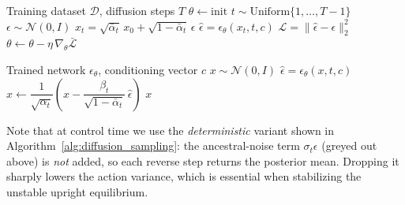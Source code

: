 \documentclass[11pt,a4paper]{article}
\begin{document}
\begin{algorithm}[H]
\caption{Diffusion Model Training}
\label{alg:diffusion_training}
\begin{algorithmic}[1]
\Require Training dataset $\mathcal{D}$, diffusion steps $T$
\State $\theta \gets \text{init}$ 
\Repeat
        \State $t \sim \mathrm{Uniform}\{1,\ldots,T-1\}$ 
        \State $\epsilon \sim \mathcal{N}(0,I)$ 
        \State $x_t = \sqrt{\bar{\alpha}_t}\,x_0 + \sqrt{1-\bar{\alpha}_t}\,\epsilon$ 
        \State $\hat{\epsilon} = \epsilon_\theta(x_t,t,c)$ 
        \State $\mathcal{L} = \lVert \hat{\epsilon}-\epsilon \rVert_2^2$ 
    \EndFor
    \State $\theta \gets \theta - \eta\,\nabla_\theta \bar{\mathcal{L}}$ 
\end{algorithmic}
\end{algorithm}

\begin{algorithm}[H]
\caption{Reverse Diffusion Sampling (deterministic, control-time)}
\label{alg:diffusion_sampling}
\begin{algorithmic}[1]
\Require Trained network $\epsilon_\theta$, conditioning vector $c$
\State $x \sim \mathcal{N}(0,I)$ 
    \State $\hat{\epsilon} = \epsilon_\theta(x,t,c)$ 
    \State $x \gets \dfrac{1}{\sqrt{\alpha_t}}\!\left(x - \dfrac{\beta_t}{\sqrt{1-\bar{\alpha}_t}}\,\hat{\epsilon}\right)$ 
     
\EndFor
\State \Return $x$ 
\end{algorithmic}
\end{algorithm}

Note that at control time we use the \emph{deterministic} variant shown in
Algorithm~\ref{alg:diffusion_sampling}: the ancestral-noise term $\sigma_t\epsilon$
(greyed out above) is \emph{not} added, so each reverse step returns the
posterior mean. Dropping it sharply lowers the action variance, which is essential
when stabilizing the unstable upright equilibrium.
\end{document}
